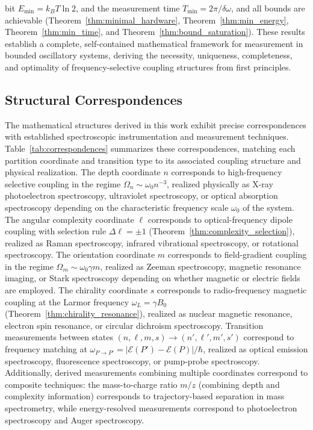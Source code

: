 \documentclass[twocolumn,10pt,a4paper]{article}
\theoremstyle{remark}
\begin{document}
bit $E_{\min} = k_B T \ln 2$, and the measurement time $T_{\min} = 2\pi/\delta\omega$, and all bounds are achievable (Theorem~\ref{thm:minimal_hardware}, Theorem~\ref{thm:min_energy}, Theorem~\ref{thm:min_time}, and Theorem~\ref{thm:bound_saturation}). These results establish a complete, self-contained mathematical framework for measurement in bounded oscillatory systems, deriving the necessity, uniqueness, completeness, and optimality of frequency-selective coupling structures from first principles.

\subsection{Structural Correspondences}

The mathematical structures derived in this work exhibit precise correspondences with established spectroscopic instrumentation and measurement techniques. Table~\ref{tab:correspondences} summarizes these correspondences, matching each partition coordinate and transition type to its associated coupling structure and physical realization. The depth coordinate $n$ corresponds to high-frequency selective coupling in the regime $\Omega_n \sim \omega_0 n^{-3}$, realized physically as X-ray photoelectron spectroscopy, ultraviolet spectroscopy, or optical absorption spectroscopy depending on the characteristic frequency scale $\omega_0$ of the system. The angular complexity coordinate $\ell$ corresponds to optical-frequency dipole coupling with selection rule $\Delta\ell = \pm 1$ (Theorem~\ref{thm:complexity_selection}), realized as Raman spectroscopy, infrared vibrational spectroscopy, or rotational spectroscopy. The orientation coordinate $m$ corresponds to field-gradient coupling in the regime $\Omega_m \sim \omega_0 \gamma m$, realized as Zeeman spectroscopy, magnetic resonance imaging, or Stark spectroscopy depending on whether magnetic or electric fields are employed. The chirality coordinate $s$ corresponds to radio-frequency magnetic coupling at the Larmor frequency $\omega_L = \gamma B_0$ (Theorem~\ref{thm:chirality_resonance}), realized as nuclear magnetic resonance, electron spin resonance, or circular dichroism spectroscopy. Transition measurements between states $(n, \ell, m, s) \to (n', \ell', m', s')$ correspond to frequency matching at $\omega_{P \to P'} = |\mathcal{E}(P') - \mathcal{E}(P)|/\hbar$, realized as optical emission spectroscopy, fluorescence spectroscopy, or pump-probe spectroscopy. Additionally, derived measurements combining multiple coordinates correspond to composite techniques: the mass-to-charge ratio $m/z$ (combining depth and complexity information) corresponds to trajectory-based separation in mass spectrometry, while energy-resolved measurements correspond to photoelectron spectroscopy and Auger spectroscopy.
\end{document}
